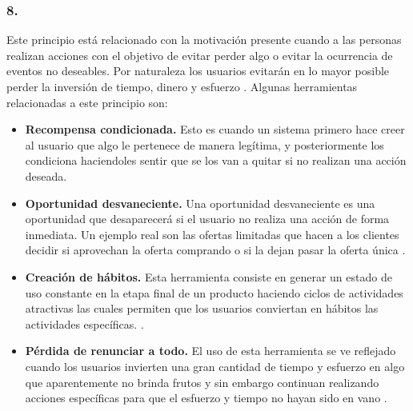 \clearpage
\subsubsection{8. \principioVIII} \label{subsec:principioVIII}

 Este principio está relacionado con la motivación presente cuando a las personas realizan acciones
 con el objetivo de evitar perder algo o evitar la ocurrencia de eventos no deseables. Por naturaleza
 los usuarios evitarán en lo mayor posible perder la inversión de tiempo, dinero y esfuerzo
 \cite[p. 311]{Octalysis}. Algunas herramientas relacionadas a este principio son:
        
    \begin{itemize}
    \item
    {\bf Recompensa condicionada.}
        Esto es cuando un sistema primero hace creer al usuario que algo le pertenece de
        manera legítima, y posteriormente los condiciona haciendoles sentir que se los
        van a quitar si no realizan una acción deseada.
        \cite[p. 330]{Octalysis}
            
    \item
    {\bf Oportunidad desvaneciente.}
        Una oportunidad desvaneciente es una oportunidad que desaparecerá si el usuario no
        realiza una acción de forma inmediata. Un ejemplo real son las ofertas limitadas
        que hacen a los clientes decidir si aprovechan la oferta comprando o si la dejan
        pasar la oferta única \cite[p. 333]{Octalysis}.
            
    \item
    {\bf Creación de hábitos.}
        Esta herramienta consiste en generar un estado de uso constante en la etapa final
        de un producto haciendo ciclos de actividades atractivas las cuales permiten que
        los usuarios conviertan en hábitos las actividades específicas.
        \cite[p. 334]{Octalysis}.
            
    \item
    {\bf Pérdida de renunciar a todo.}
        El uso de esta herramienta se ve reflejado cuando los usuarios invierten una gran
        cantidad de tiempo y esfuerzo en algo que aparentemente no brinda frutos y sin
        embargo continuan realizando acciones específicas para que el esfuerzo y tiempo
        no hayan sido en vano \cite[p. 338]{Octalysis}.

    \end{itemize}
    
\clearpage

